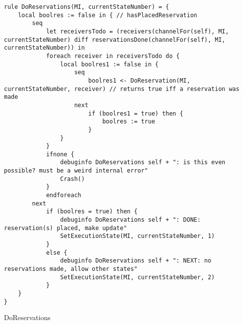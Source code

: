 \begin{listing}[H]
\begin{verbatim}
rule DoReservations(MI, currentStateNumber) = {
    local boolres := false in { // hasPlacedReservation
        seq
            let receiversTodo = (receivers(channelFor(self), MI, currentStateNumber) diff reservationsDone(channelFor(self), MI, currentStateNumber)) in
            foreach receiver in receiversTodo do {
                local boolres1 := false in {
                    seq
                        boolres1 <- DoReservation(MI, currentStateNumber, receiver) // returns true iff a reservation was made
                    next
                        if (boolres1 = true) then {
                            boolres := true
                        }
                }
            }
            ifnone {
                debuginfo DoReservations self + ": is this even possible? must be a weird internal error"
                Crash()
            }
            endforeach
        next
            if (boolres = true) then {
                debuginfo DoReservations self + ": DONE: reservation(s) placed, make update"
                SetExecutionState(MI, currentStateNumber, 1)
            }
            else {
                debuginfo DoReservations self + ": NEXT: no reservations made, allow other states"
                SetExecutionState(MI, currentStateNumber, 2)
            }
    }
}
\end{verbatim}
\caption{DoReservations}
\label{lst:asm:DoReservations}
\end{listing}





